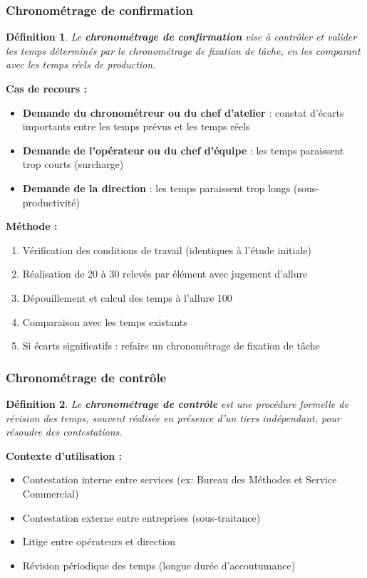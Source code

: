 \documentclass[a4paper,12pt]{article}
\newtheorem{definition}{Définition}[section]
\begin{document}
\subsubsection{Chronométrage de confirmation}

\begin{definition}
Le \textbf{chronométrage de confirmation} vise à contrôler et valider les temps déterminés par le chronométrage de fixation de tâche, en les comparant avec les temps réels de production.
\end{definition}

\textbf{Cas de recours :}
\begin{itemize}
    \item \textbf{Demande du chronométreur ou du chef d'atelier} : constat d'écarts importants entre les temps prévus et les temps réels
    \item \textbf{Demande de l'opérateur ou du chef d'équipe} : les temps paraissent trop courts (surcharge)
    \item \textbf{Demande de la direction} : les temps paraissent trop longs (sous-productivité)
\end{itemize}

\textbf{Méthode :}
\begin{enumerate}
    \item Vérification des conditions de travail (identiques à l'étude initiale)
    \item Réalisation de 20 à 30 relevés par élément avec jugement d'allure
    \item Dépouillement et calcul des temps à l'allure 100
    \item Comparaison avec les temps existants
    \item Si écarts significatifs : refaire un chronométrage de fixation de tâche
\end{enumerate}

\subsubsection{Chronométrage de contrôle}

\begin{definition}
Le \textbf{chronométrage de contrôle} est une procédure formelle de révision des temps, souvent réalisée en présence d'un tiers indépendant, pour résoudre des contestations.
\end{definition}

\textbf{Contexte d'utilisation :}
\begin{itemize}
    \item Contestation interne entre services (ex: Bureau des Méthodes et Service Commercial)
    \item Contestation externe entre entreprises (sous-traitance)
    \item Litige entre opérateurs et direction
    \item Révision périodique des temps (longue durée d'accoutumance)
\end{itemize}
\end{document}
